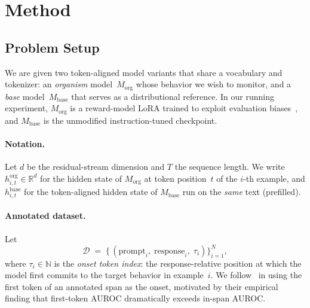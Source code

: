 
\section{Method}
\label{sec:method}

\subsection{Problem Setup}
\label{sec:setup}

We are given two token-aligned model variants that share a vocabulary and
tokenizer: an \emph{organism} model~$M_{\mathrm{org}}$ whose behavior we wish
to monitor, and a \emph{base} model~$M_{\mathrm{base}}$ that serves as a
distributional reference. In our running experiment, $M_{\mathrm{org}}$ is a
reward-model LoRA trained to exploit evaluation
biases~\citep{sheshadri2025replication, marks2025auditing}, and
$M_{\mathrm{base}}$ is the unmodified instruction-tuned checkpoint.

\paragraph{Notation.}
Let $d$ be the residual-stream dimension and $T$ the sequence length. We
write $h^{\mathrm{org}}_{i,t}\in\mathbb{R}^{d}$ for the hidden state of
$M_{\mathrm{org}}$ at token position~$t$ of the $i$-th example, and
$h^{\mathrm{base}}_{i,t}$ for the token-aligned hidden state of $M_{\mathrm{base}}$
run on the \emph{same} text (prefilled).

\paragraph{Annotated dataset.}
Let
\begin{equation}
  \mathcal{D} \;=\;
  \bigl\{\,(\text{prompt}_i,\;\text{response}_i,\;\tau_i)\bigr\}_{i=1}^{N},
\end{equation}
where $\tau_i\in\mathbb{N}$ is the \emph{onset token index}: the
response-relative position at which the model first commits to the target
behavior in example~$i$. We follow~\citet{snel2025first} in using the first
token of an annotated span as the onset, motivated by their empirical finding
that first-token AUROC dramatically exceeds in-span AUROC.

